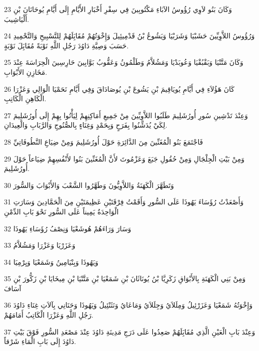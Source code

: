 \par 23 وَكَانَ بَنُو لاَوِي رُؤُوسُ الآبَاءِ مَكْتُوبِينَ فِي سِفْرِ أَخْبَارِ الأَيَّامِ إِلَى أَيَّامِ يُوحَانَانَ بْنِ أَلْيَاشِيبَ.
\par 24 وَرُؤُوسُ اللاَّوِيِّينَ حَشَبْيَا وَشَرَبْيَا وَيَشُوعُ بْنُ قَدْمِيئِيلَ وَإِخْوَتُهُمْ مُقَابَِلَهُمْ لِلتَّسْبِيحِ وَالتَّحْمِيدِ حَسَبَ وَصِيَّةِ دَاوُدَ رَجُلِ اللَّهِ نَوْبَةً مُقَابَِلَ نَوْبَةٍ.
\par 25 وَكَانَ مَتَّنْيَا وَبَقْبُقْيَا وَعُوبَدْيَا وَمَشُلاَّمُ وَطَلْمُونُ وَعَقُّوبُ بَوَّابِينَ حَارِسِينَ الْحِرَاسَةَ عِنْدَ مَخَازِنِ الأَبْوَابِ.
\par 26 كَانَ هَؤُلاَءِ فِي أَيَّامِ يُويَاقِيمَ بْنِ يَشُوعَ بْنِ يُوصَادَاقَ وَفِي أَيَّامِ نَحَمْيَا الْوَالِي وَعَزْرَا الْكَاهِنِ الْكَاتِبِ.
\par 27 وَعِنْدَ تَدْشِينِ سُورِ أُورُشَلِيمَ طَلَبُوا اللاَّوِيِّينَ مِنْ جَمِيعِ أَمَاكِنِهِمْ لِيَأْتُوا بِهِمْ إِلَى أُورُشَلِيمَ لِكَيْ يُدَشِّنُوا بِفَرَحٍ وَبِحَمْدٍ وَغِنَاءٍ بِالصُّنُوجِ وَالرَّبَابِ وَالْعِيدَانِ.
\par 28 فَاجْتَمَعَ بَنُو الْمُغَنِّينَ مِنَ الدَّائِرَةِ حَوْلَ أُورُشَلِيمَ وَمِنْ ضِيَاعِ النَّطُوفَاتِيِّ
\par 29 وَمِنْ بَيْتِ الْجِلْجَالِ وَمِنْ حُقُولِ جَبَعَ وَعَزْمُوتَ لأَنَّ الْمُغَنِّينَ بَنُوا لأَنْفُسِهِمْ ضِيَاعاً حَوْلَ أُورُشَلِيمَ.
\par 30 وَتَطَهَّرَ الْكَهَنَةُ وَاللاَّوِيُّونَ وَطَهَّرُوا الشَّعْبَ وَالأَبْوَابَ وَالسُّورَ
\par 31 وَأَصْعَدْتُ رُؤَسَاءَ يَهُوذَا عَلَى السُّورِ وَأَقَمْتُ فِرْقَتَيْنِ عَظِيمَتَيْنِ مِنَ الْحَمَّادِينَ وَسَارَتِ الْوَاحِدَةُ يَمِيناً عَلَى السُّورِ نَحْوَ بَابِ الدِّمْنِ
\par 32 وَسَارَ وَرَاءَهُمْ هُوشَعْيَا وَنِصْفُ رُؤَسَاءِ يَهُوذَا
\par 33 وَعَزَرْيَا وَعَزْرَا وَمَشُلاَّمُ
\par 34 وَيَهُوذَا وَبِنْيَامِينُ وَشَمَعْيَا وَيِرْمِيَا
\par 35 وَمِنْ بَنِي الْكَهَنَةِ بِالأَبْوَاقِ زَكَرِيَّا بْنُ يُونَاثَانَ بْنِ شَمَعْيَا بْنِ مَتَّنْيَا بْنِ مِيخَايَا بْنِ زَكُّورَ بْنِ آسَافَ
\par 36 وَإِخْوَتُهُ شَمَعْيَا وَعَزَرْئِيلُ وَمِلَلاَيُ وَجِلَلاَيُ وَمَاعَايُ وَنَثَنْئِيلُ وَيَهُوذَا وَحَنَانِي بِآلاَتِ غِنَاءِ دَاوُدَ رَجُلِ اللَّهِ وَعَزْرَا الْكَاتِبُ أَمَامَهُمْ.
\par 37 وَعِنْدَ بَابِ الْعَيْنِ الَّذِي مُقَابَِلَهُمْ صَعِدُوا عَلَى دَرَجِ مَدِينَةِ دَاوُدَ عِنْدَ مَصْعَدِ السُّورِ فَوْقَ بَيْتِ دَاوُدَ إِلَى بَابِ الْمَاءِ شَرْقاً.
